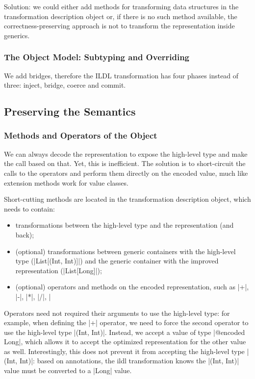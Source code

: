 Solution: we could either add methods for transforming data structures in the transformation description object or, if there is no such method available, the correctness-preserving approach is not to transform the representation inside generics.


\subsubsection{The Object Model: Subtyping and Overriding}
We add bridges, therefore the ILDL transformation has four phases instead of three: inject, bridge, coerce and commit.


\subsection{Preserving the Semantics}
\label{sec:ildl:semantics}

\subsubsection{Methods and Operators of the Object}
We can always decode the representation to expose the high-level type and make the call based on that. Yet, this is inefficient. The solution is to short-circuit the calls to the operators and perform them directly on the encoded value, much like extension methods work for value classes.

Short-cutting methods are located in the transformation description object, which needs to contain:
\begin{itemize}
  \item transformations between the high-level type and the representation (and back);
  \item (optional) transformations between generic containers with the high-level type (|List[(Int, Int)]|) and the generic container with the improved representation (|List[Long]|);
  \item (optional) operators and methods on the encoded representation, such as |+|, |-|, |*|, |/|, |%
\end{itemize}

Operators need not required their arguments to use the high-level type: for example, when defining the |+| operator, we need to force the second operator to use the high-level type |(Int, Int)|. Instead, we accept a value of type |@encoded Long|, which allows it to accept the optimized representation for the other value as well. Interestingly, this does not prevent it from accepting the high-level type |(Int, Int)|: based on annotations, the ildl transformation knows the |(Int, Int)| value must be converted to a |Long| value.

